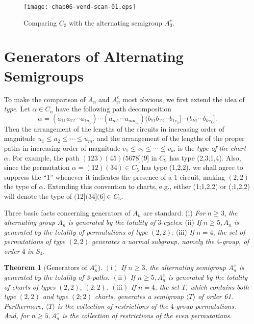 \documentclass{surv-l}
\numberwithin{equation}{section}
\numberwithin{table}{section}
\numberwithin{figure}{section}
\newtheorem{theorem}[equation]{Theorem}
\theoremstyle{definition}
\begin{document}
\setcounter{figure}{3}
\begin{figure}[!h]
\texttt{[image: chap06-vend-scan-01.eps]}
\caption{Comparing $C_{3}$ with the alternating semigroup
$A_{3}^{c}$.\label{fig6.25.4}}
\end{figure}

\section{Generators of Alternating Semigroups}\label{sec6.26}

To make the comparison of $A_{n}$ and $A_{n}^{c}$ most obvious, we
first extend the idea of \emph{type}. Let $\alpha\in C_{n}$ have
the following path decomposition
\[
\alpha=(a_{11}a_{12}\cdots a_{1u_{1}})\cdots(a_{m1}\cdots
a_{mu_{m}})(b_{11}b_{12}\cdots b_{1v_{1}}]\cdots(b_{k1}\cdots
b_{kv_{k}}].
\]
Then the arrangement of the lengths of the circuits in increasing
order of magnitude $u_{1}\leq u_{2}\leq\cdots\leq u_{m}$, and the
arrangement of the lengths of the proper paths in increasing order
of magnitude $v_{1}\leq v_{2}\leq\cdots\leq v_{k}$, is the
\emph{type of the chart} $\alpha$. For example, the path
$(123)(45)(5678](9]$ in $C_{9}$ has type (2,3;1,4). Also, since
the permutation $\alpha=(12)(34)\in C_{5}$ has type (1,2,2), we
shall agree to suppress the ``1'' whenever it indicates the
presence of a 1-circuit, making $(2,2)$ the type of $\alpha$.
Extending this convention to charts, e.g., either (1;1,2,2) or
(;1,2,2) will denote the type of $(12](34](6]\in C_{5}$.

Three basic facts concerning generators
of $A_{n}$ are standard: (i)
\emph{For} $n \geq 3$, \emph{the alternating
group} $A_{n}$ \emph{is generated by the
totality of} 3-\emph{cycles}; (ii) \emph{If} $n \geq 5, A_{n}$
\emph{is generated by the totality of permutations of type} $(2,2)$;
(iii) \emph{If} $n =4$, \emph{the set of permutations of type}
$(2,2)$ \emph{generates a normal subgroup, namely the} 4-\emph{group,
of order} 4 \emph{in} $S_{4}$.

\begin{theorem}[Generators of $A_{n}^{c}$]\label{thm6.26.1}
$(\mathrm{i})$ If $n \geq 3$, the alternating semigroup
$A_{n}^{c}$ is generated by the totality of 3-paths.
$\mathrm{(ii)}$ If $n \geq 5, A_{n}^{c}$ is generated by the
totality of charts of types $(2, 2)$, $(2; 2)$. $(\mathrm{iii})$
If $n =4$, the set $T$, which contains both type $(2, 2)$ and type
$(2; 2)$ charts, generates a semigroup $\langle T\rangle$ of order
61. Furthermore, $\langle T\rangle$ is the collection of
restrictions of the $4$-group permutations. And, for $n \geq 5,
A_{n}^{c}$ is the collection of restrictions of the even
permutations.
\end{theorem}
\end{document}
